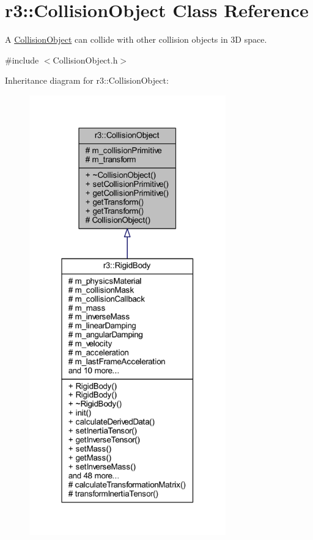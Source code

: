 \hypertarget{classr3_1_1_collision_object}{}\section{r3\+:\+:Collision\+Object Class Reference}
\label{classr3_1_1_collision_object}


A \mbox{\hyperlink{classr3_1_1_collision_object}{Collision\+Object}} can collide with other collision objects in 3D space.  




{\ttfamily \#include $<$Collision\+Object.\+h$>$}



Inheritance diagram for r3\+:\+:Collision\+Object\+:\nopagebreak
\begin{figure}[H]
\begin{center}
\leavevmode
\includegraphics[width=241pt]{classr3_1_1_collision_object__inherit__graph}
\end{center}
\end{figure}


